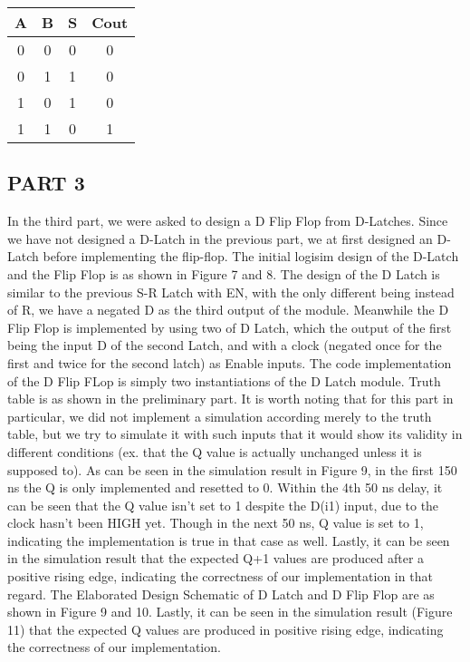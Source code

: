 \documentclass[pdftex,12pt,a4paper]{article}
\begin{document}
\begin{center}
 \begin{tabular}{|c|c|c|c|} 
 \hline
 A & B & S & Cout  \\ 
 \hline\hline
 0 & 0 & 0 & 0\\ 
 \hline
 0 & 1 & 1 & 0\\
 \hline
 1 & 0 & 1 & 0\\
 \hline
 1 & 1 & 0 & 1 \\
 \hline
\end{tabular}
\end{center}

\newpage
\subsection{PART 3}
In the third part, we were asked to design a D Flip Flop from D-Latches. Since we have not designed a D-Latch in the previous part, we at first designed an D-Latch before implementing the flip-flop. The initial logisim design of the D-Latch and the Flip Flop is as shown in Figure 7 and 8. The design of the D Latch is similar to the previous S-R Latch with EN, with the only different being instead of R, we have a negated D as the third output of the module. Meanwhile the D Flip Flop is implemented by using two of D Latch, which the output of the first being the input D of the second Latch, and with a clock (negated once for the first and twice for the second latch) as Enable inputs. The code implementation of the D Flip FLop is simply two instantiations of the D Latch module. Truth table is as shown in the preliminary part. It is worth noting that for this part in particular, we did not implement a simulation according merely to the truth table, but we try to simulate it with such inputs that it would show its validity in different conditions (ex. that the Q value is actually unchanged unless it is supposed to). As can be seen in the simulation result in Figure 9, in the first 150 ns the Q is only implemented and resetted to 0. Within the 4th 50 ns delay, it can be seen that the Q value isn't set to 1 despite the D(i1) input, due to the clock hasn't been HIGH yet. Though in the next 50 ns, Q value is set to 1, indicating the implementation is true in that case as well. Lastly, it can be seen in the simulation result that the expected Q+1 values are produced after a positive rising edge, indicating the correctness of our implementation in that regard. The Elaborated Design Schematic of D Latch and D Flip Flop are as shown in Figure 9 and 10. Lastly, it can be seen in the simulation result (Figure 11) that the expected Q values are produced in positive rising edge, indicating the correctness of our implementation.
\end{document}
